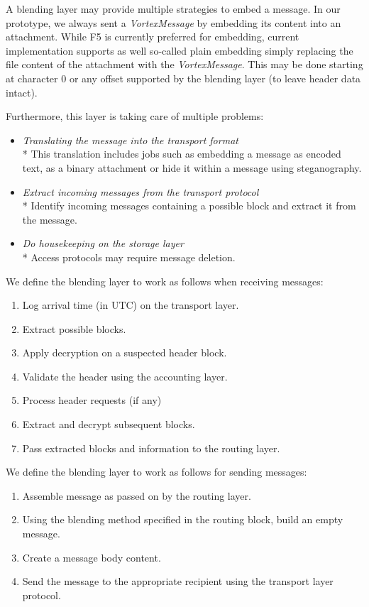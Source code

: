 \documentclass[acmsmall, screen]{acmart}
\begin{document}
A blending layer may provide multiple strategies to embed a message. In our prototype, we always sent a \emph{VortexMessage} by embedding its content into an attachment. While F5\cite{f5} is currently preferred for embedding, current implementation supports as well so-called plain embedding simply replacing the file content of the attachment with the \emph{VortexMessage}. This may be done starting at character 0 or any offset supported by the blending layer (to leave header data intact).

Furthermore, this layer is taking care of multiple problems:
\begin{itemize}
	\item \emph{Translating the message into the transport format}\\*
	This translation includes jobs such as embedding a message as encoded text, as a binary attachment or hide it within a message using steganography.
	\item \emph{Extract incoming messages from the transport protocol}\\*
	Identify incoming messages containing a possible block and extract it from the message.
	\item \emph{Do housekeeping on the storage layer}\\*
	Access protocols may require message deletion.
\end{itemize}

We define the blending layer to work as follows when receiving messages:
\begin{enumerate}
	\item Log arrival time (in UTC) on the transport layer.
	\item Extract possible blocks.
	\item Apply decryption on a suspected header block.
	\item Validate the header using the accounting layer.
	\item Process header requests (if any)
	\item Extract and decrypt subsequent blocks.
	\item Pass extracted blocks and information to the routing layer.
\end{enumerate}

We define the blending layer to work as follows for sending messages:
\begin{enumerate}
	\item Assemble message as passed on by the routing layer.
	\item Using the blending method specified in the routing block, build an empty message. 
	\item Create a message body content.
	\item Send the message to the appropriate recipient using the transport layer protocol.
\end{enumerate}
\end{document}
